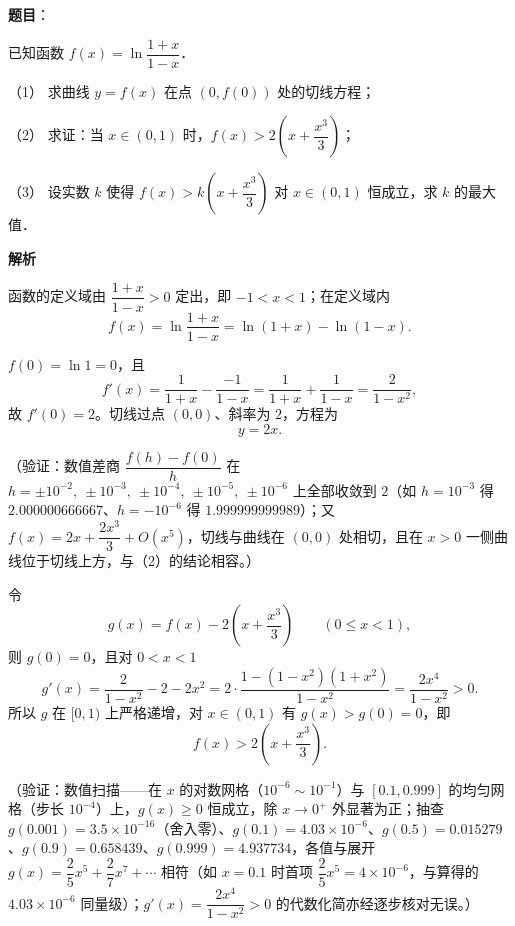 \begin{answer}

\textbf{题目}：

已知函数 \(f(x)=\ln\dfrac{1+x}{1-x}\)．

（1） 求曲线 \(y=f(x)\) 在点 \((0,f(0))\) 处的切线方程；

（2） 求证：当 \(x\in(0,1)\) 时，\(f(x)>2\left(x+\dfrac{x^{3}}{3}\right)\)；

（3） 设实数 \(k\) 使得 \(f(x)>k\left(x+\dfrac{x^{3}}{3}\right)\) 对 \(x\in(0,1)\) 恒成立，求 \(k\) 的最大值．

\textbf{解析}

函数的定义域由 \(\dfrac{1+x}{1-x}>0\) 定出，即 \(-1<x<1\)；在定义域内
\nopagebreak[4]
\[
f(x)=\ln\frac{1+x}{1-x}=\ln(1+x)-\ln(1-x).
\]


\(f(0)=\ln 1=0\)，且
\nopagebreak[4]
\[
f'(x)=\frac{1}{1+x}-\frac{-1}{1-x}=\frac{1}{1+x}+\frac{1}{1-x}=\frac{2}{1-x^{2}},
\]
故 \(f'(0)=2\)。切线过点 \((0,0)\)、斜率为 \(2\)，方程为
\nopagebreak[4]
\[
y=2x .
\]

（验证：数值差商 \(\dfrac{f(h)-f(0)}{h}\) 在 \(h=\pm10^{-2},\ \pm10^{-3},\ \pm10^{-4},\ \pm10^{-5},\ \pm10^{-6}\) 上全部收敛到 \(2\)（如 \(h=10^{-3}\) 得 \(2.000000666667\)、\(h=-10^{-6}\) 得 \(1.999999999989\)）；又 \(f(x)=2x+\dfrac{2x^{3}}{3}+O(x^{5})\)，切线与曲线在 \((0,0)\) 处相切，且在 \(x>0\) 一侧曲线位于切线上方，与（2）的结论相容。）


令
\nopagebreak[4]
\[
g(x)=f(x)-2\left(x+\frac{x^{3}}{3}\right)\qquad(0\leqslant x<1),
\]
则 \(g(0)=0\)，且对 \(0<x<1\)
\nopagebreak[4]
\[
g'(x)=\frac{2}{1-x^{2}}-2-2x^{2}=2\cdot\frac{1-(1-x^{2})(1+x^{2})}{1-x^{2}}=\frac{2x^{4}}{1-x^{2}}>0 .
\]
所以 \(g\) 在 \([0,1)\) 上严格递增，对 \(x\in(0,1)\) 有 \(g(x)>g(0)=0\)，即
\nopagebreak[4]
\[
f(x)>2\left(x+\frac{x^{3}}{3}\right).
\]

（验证：数值扫描——在 \(x\) 的对数网格（\(10^{-6}\sim10^{-1}\)）与 \([0.1,0.999]\) 的均匀网格（步长 \(10^{-4}\)）上，\(g(x)\geqslant0\) 恒成立，除 \(x\to0^{+}\) 外显著为正；抽查 \(g(0.001)=3.5\times10^{-16}\)（舍入零）、\(g(0.1)=4.03\times10^{-6}\)、\(g(0.5)=0.015279\)、\(g(0.9)=0.658439\)、\(g(0.999)=4.937734\)，各值与展开 \(g(x)=\dfrac{2}{5}x^{5}+\dfrac{2}{7}x^{7}+\cdots\) 相符（如 \(x=0.1\) 时首项 \(\dfrac{2}{5}x^{5}=4\times10^{-6}\)，与算得的 \(4.03\times10^{-6}\) 同量级）；\(g'(x)=\dfrac{2x^{4}}{1-x^{2}}>0\) 的代数化简亦经逐步核对无误。）


\end{answer}
